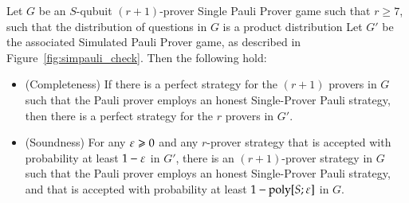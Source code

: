 \begin{theorem}
Let $G$ be an $S$-qubuit $(r+1)$-prover Single Pauli Prover game such that $r\geq 7$, such that the distribution of questions in $G$ is a product distribution Let $G'$ be the associated Simulated Pauli Prover game, as described in Figure~\ref{fig:simpauli_check}. Then the following hold:
\begin{itemize}
\item (Completeness) If there is a perfect strategy for the $(r+1)$ provers in $G$ such that the Pauli prover employs an honest Single-Prover Pauli strategy, then there is a perfect strategy for the $r$ provers in $G'$. 
\item (Soundness) For any $\varepsilon\geqslant 0$ and any $r$-prover strategy that is accepted with probability at least $1-\varepsilon$ in $G'$, there is an $(r+1)$-prover strategy in $G$ such that the Pauli prover employs an honest Single-Prover Pauli strategy, and that is accepted with probability at least $1-\operatorname{poly}[S;\varepsilon]$ in $G$.
\end{itemize}
\end{theorem}

